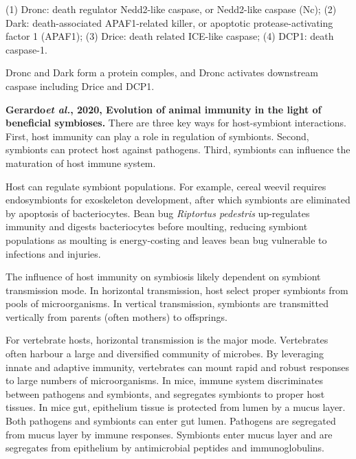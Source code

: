 \documentclass[11pt]{article}
\begin{document}
\begin{sloppypar}
(1) Dronc: death regulator Nedd2-like caspase, or Nedd2-like caspase (Nc); \newline
(2) Dark: death-associated APAF1-related killer, or apoptotic protease-activating factor 1 (APAF1); \newline
(3) Drice: death related ICE-like caspase; \newline
(4) DCP1: death caspase-1. 
\par
Dronc and Dark form a protein comples, and Dronc activates downstream caspase including Drice and DCP1.
\par \newline \newline
\textbf{Gerardo\textit{et al.}, 2020, Evolution of animal immunity in the light of beneficial symbioses.}
There are three key ways for host-symbiont interactions. 
First, host immunity can play a role in regulation of symbionts. 
Second, symbionts can protect host against pathogens. 
Third, symbionts can influence the maturation of host immune system. 
\par
Host can regulate symbiont populations. 
For example, cereal weevil requires endosymbionts for exoskeleton development, after which symbionts are eliminated by apoptosis of bacteriocytes. 
Bean bug \textit{Riptortus pedestris} up-regulates immunity and digests bacteriocytes before moulting, reducing symbiont populations as moulting is energy-costing and leaves bean bug vulnerable to infections and injuries. 
\par
The influence of host immunity on symbiosis likely dependent on symbiont transmission mode. 
In horizontal transmission, host select proper symbionts from pools of microorganisms. 
In vertical transmission, symbionts are transmitted vertically from parents (often mothers) to offsprings. 
\par
For vertebrate hosts, horizontal transmission is the major mode. 
Vertebrates often harbour a large and diversified community of microbes. 
By leveraging innate and adaptive immunity, vertebrates can mount rapid and robust responses to large numbers of microorganisms. 
In mice, immune system discriminates between pathogens and symbionts, and segregates symbionts to proper host tissues. 
In mice gut, epithelium tissue is protected from lumen by a mucus layer. 
Both pathogens and symbionts can enter gut lumen. 
Pathogens are segregated from mucus layer by immune responses. 
Symbionts enter mucus layer and are segregates from epithelium by antimicrobial peptides and immunoglobulins. 
\par

\end{sloppypar}
\end{document}
